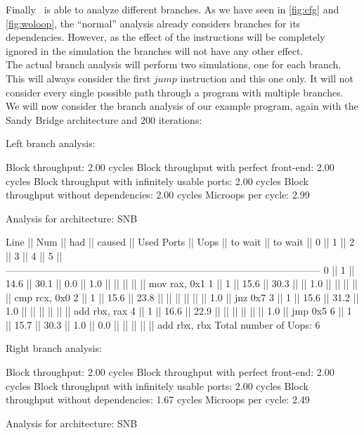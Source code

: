 Finally \suaca\ is able to analyze different branches. As we have seen in \autoref{fig:cfg} and \autoref{fig:woloop}, the ``normal'' analysis already considers branches for its dependencies. However, as the effect of the instructions will be completely ignored in the simulation the branches will not have any other effect.\\
The actual branch analysis will perform two simulations, one for each branch. This will always consider the first $jump$ instruction and this one only. It will not consider every single possible path through a program with multiple branches. We will now consider the branch analysis of our example program, again with the Sandy Bridge architecture and $200$ iterations:

\begin{example}
Left branch analysis:

Block throughput: 2.00 cycles
Block throughput with perfect front-end: 2.00 cycles
Block throughput with infinitely usable ports: 2.00 cycles
Block throughput without dependencies: 2.00 cycles
Microops per cycle: 2.99

Analysis for architecture: SNB

 Line  ||   Num   ||   had   || caused  ||            Used Ports
       ||   Uops  || to wait || to wait ||   0   ||   1   ||   2   ||   3   ||   4   ||   5   ||
 ------------------------------------------------------------------------------------------------
   0   ||    1    ||  14.6   ||  30.1   ||  0.0  ||  1.0  ||       ||       ||       ||       || mov rax, 0x1
   1   ||    1    ||  15.6   ||  30.3   ||       ||  1.0  ||       ||       ||       ||       || cmp rcx, 0x0
   2   ||    1    ||  15.6   ||  23.8   ||       ||       ||       ||       ||       ||  1.0  || jnz 0x7
   3   ||    1    ||  15.6   ||  31.2   ||  1.0  ||       ||       ||       ||       ||       || add rbx, rax
   4   ||    1    ||  16.6   ||  22.9   ||       ||       ||       ||       ||       ||  1.0  || jmp 0x5
   6   ||    1    ||  15.7   ||  30.3   ||  1.0  ||  0.0  ||       ||       ||       ||       || add rbx, rbx
Total number of Uops: 6


Right branch analysis:

Block throughput: 2.00 cycles
Block throughput with perfect front-end: 2.00 cycles
Block throughput with infinitely usable ports: 2.00 cycles
Block throughput without dependencies: 1.67 cycles
Microops per cycle: 2.49

Analysis for architecture: SNB


\end{example}
